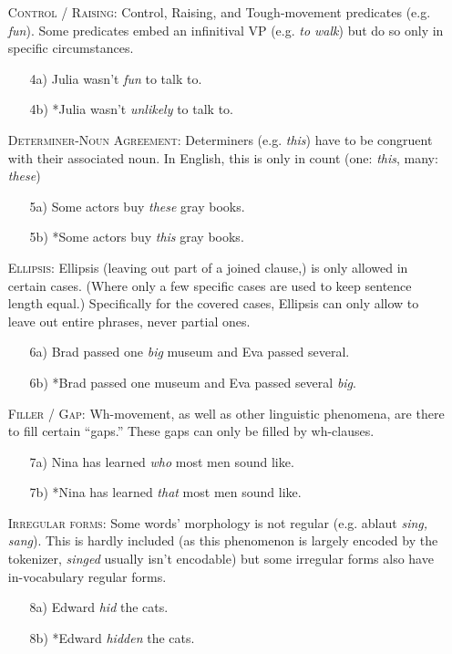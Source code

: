 \documentclass[11pt]{article}
\begin{document}
\begin{itemize}
\item[] \textsc{Control / Raising}: Control, Raising, and Tough-movement predicates (e.g. \textit{fun}). Some predicates embed an infinitival VP (e.g. \textit{to walk}) but do so only in specific circumstances.
    \begin{itemize}
        \item[4a)] Julia wasn’t \textit{fun} to talk to.
        \item[4b)] *Julia wasn’t \textit{unlikely} to talk to.
    \end{itemize}

\item[] \textsc{Determiner-Noun Agreement}: Determiners (e.g. \textit{this}) have to be congruent with their associated noun. In English, this is only in count (one: \textit{this}, many: \textit{these})
    \begin{itemize}
        \item[5a)] Some actors buy \textit{these} gray books.
        \item[5b)] *Some actors buy \textit{this} gray books.
    \end{itemize}

\item[] \textsc{Ellipsis}: Ellipsis (leaving out part of a joined clause,) is only allowed in certain cases. (Where only a few specific cases are used to keep sentence length equal.) Specifically for the covered cases, Ellipsis can only allow to leave out entire phrases, never partial ones.
    \begin{itemize}
        \item[6a)] Brad passed one \textit{big} museum and Eva passed several.
        \item[6b)] *Brad passed one museum and Eva passed several \textit{big}.
    \end{itemize}

\item[] \textsc{Filler / Gap}: Wh-movement, as well as other linguistic phenomena, are there to fill certain ``gaps.'' These gaps can only be filled by wh-clauses.
    \begin{itemize}
        \item[7a)] Nina has learned \textit{who} most men sound like.
        \item[7b)] *Nina has learned \textit{that} most men sound like.
    \end{itemize}

\item[] \textsc{Irregular forms}: Some words' morphology is not regular (e.g. ablaut \textit{sing, sang}). This is hardly included (as this phenomenon is largely encoded by the tokenizer, \textit{singed} usually isn't encodable) but some irregular forms also have in-vocabulary regular forms.
    \begin{itemize}
        \item[8a)] Edward \textit{hid} the cats.
        \item[8b)] *Edward \textit{hidden} the cats.
    \end{itemize}



\end{itemize}
\end{document}
